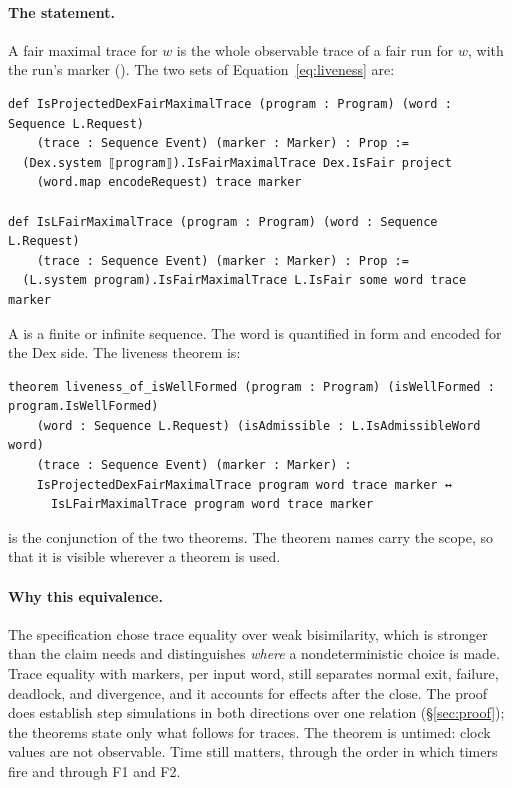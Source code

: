 \paragraph{The statement.}
A fair maximal trace for $w$ is the whole observable trace of a fair run
for $w$, with the run's marker (). The two sets of
Equation~\eqref{eq:liveness} are:

\begin{Verbatim}
def IsProjectedDexFairMaximalTrace (program : Program) (word : Sequence L.Request)
    (trace : Sequence Event) (marker : Marker) : Prop :=
  (Dex.system ⟦program⟧).IsFairMaximalTrace Dex.IsFair project
    (word.map encodeRequest) trace marker

def IsLFairMaximalTrace (program : Program) (word : Sequence L.Request)
    (trace : Sequence Event) (marker : Marker) : Prop :=
  (L.system program).IsFairMaximalTrace L.IsFair some word trace marker
\end{Verbatim}

A  is a finite or infinite sequence. The word is quantified
in \Lang{} form and encoded for the Dex side. The liveness theorem is:

\begin{Verbatim}
theorem liveness_of_isWellFormed (program : Program) (isWellFormed : program.IsWellFormed)
    (word : Sequence L.Request) (isAdmissible : L.IsAdmissibleWord word)
    (trace : Sequence Event) (marker : Marker) :
    IsProjectedDexFairMaximalTrace program word trace marker ↔
      IsLFairMaximalTrace program word trace marker
\end{Verbatim}

 is the conjunction of the two
theorems. The theorem names carry the scope, so that it is visible wherever
a theorem is used.

\paragraph{Why this equivalence.}
The specification chose trace equality over weak bisimilarity, which is
stronger than the claim needs and distinguishes \emph{where} a
nondeterministic choice is made. Trace equality with markers, per input
word, still separates normal exit, failure, deadlock, and divergence, and
it accounts for effects after the close. The proof does establish step
simulations in both directions over one relation (\S\ref{sec:proof}); the
theorems state only what follows for traces. The theorem is untimed: clock values are not observable. Time still
matters, through the order in which timers fire and through F1 and F2.

